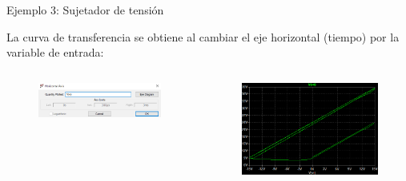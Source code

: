 \documentclass[t,aspectratio=169]{beamer}
\begin{document}
\begin{frame}{Ejemplo 3: Sujetador de tensión}

La curva de transferencia se obtiene al cambiar el eje horizontal (tiempo) por la variable de entrada:

\begin{columns}
\begin{column}{0.5\textwidth}

\begin{figure}
    \centering
    \includegraphics[width=\textwidth]{figures/sujetador_ejemplo_3a.png}
\end{figure}
    
\end{column}
\begin{column}{0.5\textwidth}

\begin{figure}
    \centering
    \includegraphics[width=\textwidth]{figures/sujetador_ejemplo_3b.png}
\end{figure}

\end{column}    
\end{columns}
    
\end{frame}
\end{document}
